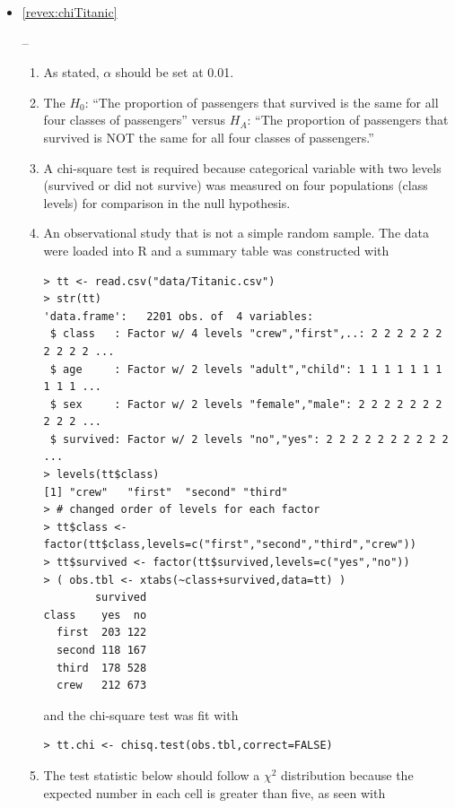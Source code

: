 \documentclass[10pt,openany]{book}\usepackage[]{graphicx}\usepackage[]{color}
\makeatletter
\newenvironment{kframe}{%
 \def\at@end@of@kframe{}%
 \ifinner\ifhmode%
  \def\at@end@of@kframe{\end{minipage}}%
  \begin{minipage}{\columnwidth}%
 \fi\fi%
 \def\FrameCommand##1{\hskip\@totalleftmargin \hskip-\fboxsep
 \colorbox{shadecolor}{##1}\hskip-\fboxsep
     \hskip-\linewidth \hskip-\@totalleftmargin \hskip\columnwidth}%
 \MakeFramed {\advance\hsize-\width
   \@totalleftmargin\z@ \linewidth\hsize
   \@setminipage}}%
 {\par\unskip\endMakeFramed%
 \at@end@of@kframe}
\newenvironment{knitrout}{}{} %
\makeatother
\begin{document}
\begin{itemize}
  \item \hypertarget{ans:chiTitanic}{\ref{revex:chiTitanic}} --
    \begin{enumerate}
      \item As stated, $\alpha$ should be set at 0.01.
      \item The $H_{0}$: ``The proportion of passengers that survived is the same for all four classes of passengers'' versus $H_{A}$: ``The proportion of passengers that survived is NOT the same for all four classes of passengers.''
      \item A chi-square test is required because categorical variable with two levels (survived or did not survive) was measured on four populations (class levels) for comparison in the null hypothesis.
      \item An observational study that is not a simple random sample.  The data were loaded into R and a summary table was constructed with
\begin{knitrout}
\color{fgcolor}\begin{kframe}
\begin{verbatim}
> tt <- read.csv("data/Titanic.csv")
> str(tt)
'data.frame':	2201 obs. of  4 variables:
 $ class   : Factor w/ 4 levels "crew","first",..: 2 2 2 2 2 2 2 2 2 2 ...
 $ age     : Factor w/ 2 levels "adult","child": 1 1 1 1 1 1 1 1 1 1 ...
 $ sex     : Factor w/ 2 levels "female","male": 2 2 2 2 2 2 2 2 2 2 ...
 $ survived: Factor w/ 2 levels "no","yes": 2 2 2 2 2 2 2 2 2 2 ...
> levels(tt$class)
[1] "crew"   "first"  "second" "third" 
> # changed order of levels for each factor
> tt$class <- factor(tt$class,levels=c("first","second","third","crew"))
> tt$survived <- factor(tt$survived,levels=c("yes","no"))
> ( obs.tbl <- xtabs(~class+survived,data=tt) )
        survived
class    yes  no
  first  203 122
  second 118 167
  third  178 528
  crew   212 673
\end{verbatim}
\end{kframe}
\end{knitrout}
and the chi-square test was fit with
\begin{knitrout}
\color{fgcolor}\begin{kframe}
\begin{verbatim}
> tt.chi <- chisq.test(obs.tbl,correct=FALSE)
\end{verbatim}
\end{kframe}
\end{knitrout}
      \item The test statistic below should follow a $\chi^{2}$ distribution because the expected number in each cell is greater than five, as seen with

\end{enumerate}
\end{itemize}
\end{document}
